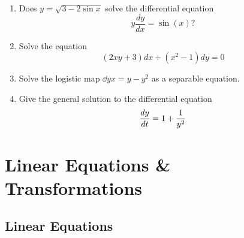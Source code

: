 \documentclass[10pt,driverfallback=hypertex]{report}
\begin{document}
\begin{enumerate}
\item
  Does $y = \sqrt{3-2\sin x}$ solve the differential equation
  \begin{dmath*}
    y\frac{dy}{dx}=\sin(x)?
  \end{dmath*}

\item
  Solve the equation
  \begin{dmath*}
    (2xy + 3) dx + (x^2 - 1) dy = 0
  \end{dmath*}

\item
  Solve the logistic map $\dd{y}{x} = y - y^2$ as a separable equation.

\item
  Give the general solution to the differential equation
  \begin{dmath*}
    \ddt{y} = 1 + \frac{1}{y^2}
  \end{dmath*}

\end{enumerate}



\chapter{Linear Equations \& Transformations}
\newpage

\section{Linear Equations}
\end{document}
